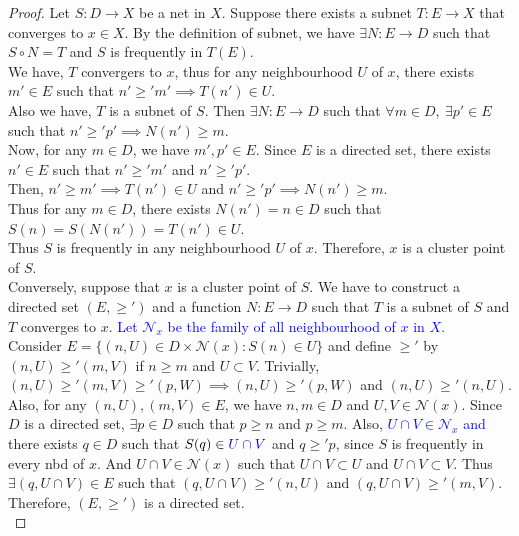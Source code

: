 \begin{proof}
	Let $S : D \to X$ be a net in $X$. Suppose there exists a subnet $T : E \to X$ that converges to $x \in X$. By the definition of subnet, we have $\exists N : E \to D$ such that $S \circ N = T$ and $S$ is frequently in $T(E)$.\\

	We have, $T$ convergers to $x$, thus for any neighbourhood $U$ of $x$, there exists $m' \in E$ such that $n' \ge' m' \implies T(n') \in U$.\\

	Also we have, $T$ is a subnet of $S$. Then $\exists N : E \to D$ such that
	$\forall m \in D,\ \exists p' \in E$ such that $n' \ge' p' \implies N(n') \ge m$.\\

	Now, for any $m \in D$, we have $m',p' \in E$. Since $E$ is a directed set, there exists $n' \in E$ such that $n' \ge' m'$ and $n' \ge' p'$.\\

	Then, $n' \ge m' \implies T(n') \in U$ and $n' \ge' p' \implies N(n') \ge m$.\\
	
	Thus for any $m \in D$, there exists $N(n') = n \in D$ such that $S(n) = S(N(n')) = T(n') \in U$.\\

	Thus $S$ is frequently in any neighbourhood $U$ of $x$. Therefore, $x$ is a cluster point of $S$.\\

	Conversely, suppose that $x$ is a cluster point of $S$. We have to construct a directed set $(E,\ge')$ and a function $N : E \to D$ such that $T$ is a subnet of $S$ and $T$ converges to $x$. \textcolor{blue}{Let $\mathcal{N}_x$ be the family of all neighbourhood of $x$ in $X$.}\\

	Consider $E = \{ (n,U) \in D \times \mathcal{N}(x) : S(n) \in U \}$ and define $\ge'$ by $(n,U) \ge' (m,V)$ if $n \ge m$ and $U \subset V$. Trivially, $(n,U) \ge' (m,V) \ge' (p,W) \implies (n,U) \ge' (p,W)$ and $(n,U) \ge' (n,U)$. Also, for any $(n,U),(m,V) \in E$, we have $n,m \in D$ and $U,V \in \mathcal{N}(x)$. Since $D$ is a directed set, $\exists p \in D$ such that $p \ge n$ and $p \ge m$. Also, \textcolor{blue}{$U \cap V \in \mathcal{N}_x$ and} there exists $q \in D$ such that $S(q) \in \textcolor{blue}{U \cap V}$ and $q \ge' p$, since $S$ is frequently in every nbd of $x$. And $U \cap V \in \mathcal{N}(x)$ such that $U \cap V \subset U$ and $U \cap V \subset V$. Thus $\exists (q,U\cap V) \in E$ such that $(q,U\cap V) \ge' (n,U)$ and $(q,U\cap V) \ge' (m,V)$. Therefore, $(E,\ge')$ is a directed set.\\


\end{proof}
